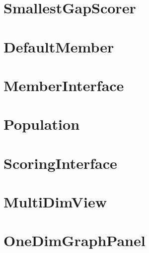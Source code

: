 \documentclass{article}
\begin{document}
\section{SmallestGapScorer}

\section{DefaultMember}

\section{MemberInterface}

\section{Population}

\section{ScoringInterface}

\section{MultiDimView}

\section{OneDimGraphPanel}

\end{document}
